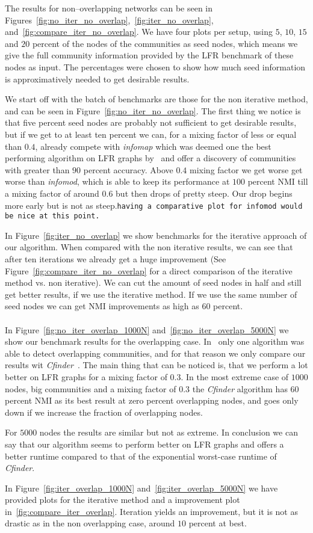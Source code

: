 The results for non--overlapping networks can be seen in Figures~\ref{fig:no_iter_no_overlap},~\ref{fig:iter_no_overlap}, and~\ref{fig:compare_iter_no_overlap}. We have four plots per setup, using $5$, $10$, $15$ and $20$ percent of the nodes of the communities as seed nodes, which means we give the full community information provided by the LFR benchmark of these nodes as input. The percentages were chosen to show how much seed information is approximatively needed to get desirable results.

We start off with the batch of benchmarks are those for the non iterative method, and can be seen in Figure~\ref{fig:no_iter_no_overlap}. The first thing we notice is that five percent seed nodes are probably not sufficient to get desirable results, but if we get to at least ten percent we can, for a mixing factor of less or equal than $0.4$, already compete with \textit{infomap} which was deemed one the best performing algorithm on LFR graphs by~\cite{LF09} and offer a discovery of communities with greater than $90$ percent accuracy. Above $0.4$ mixing factor we get worse get worse than \textit{infomod}, which is able to keep its performance at $100$ percent NMI till a mixing factor of around $0.6$ but then drops of pretty steep. Our drop begins more early but is not as steep.\texttt{having a comparative plot for infomod would be nice at this point.}

In Figure~\ref{fig:iter_no_overlap} we show benchmarks for the iterative approach of our algorithm. When compared with the non iterative results, we can see that after ten iterations we already get a huge improvement (See Figure~\ref{fig:compare_iter_no_overlap} for a direct comparison of the iterative method vs. non iterative). We can cut the amount of seed nodes in half and still get better results, if we use the iterative method. If we use the same number of seed nodes we can get NMI improvements as high as $60$ percent.\\ \\
In Figure~\ref{fig:no_iter_overlap_1000N} and~\ref{fig:no_iter_overlap_5000N} we show our benchmark results for the overlapping case. In~\cite{LF09} only one algorithm was able to detect overlapping communities, and for that reason we only compare our results wit \textit{Cfinder}~\cite{PDFV05}. The main thing that can be noticed is, that we perform a lot better on LFR graphs for a mixing factor of $0.3$. In the most extreme case of $1000$ nodes, big communities and a mixing factor of $0.3$ the \textit{Cfinder} algorithm has $60$ percent NMI as its best result at zero percent overlapping nodes, and goes only down if we increase the fraction of overlapping nodes.

For $5000$ nodes the results are similar but not as extreme. In conclusion we can say that our algorithm seems to perform better on LFR graphs and offers a better runtime compared to that of the exponential worst-case runtime of \textit{Cfinder}.

In Figure~\ref{fig:iter_overlap_1000N} and~\ref{fig:iter_overlap_5000N} we have provided plots for the iterative method and a improvement plot in~\ref{fig:compare_iter_overlap}. Iteration yields an improvement, but it is not as drastic as in the non overlapping case, around $10$ percent at best.